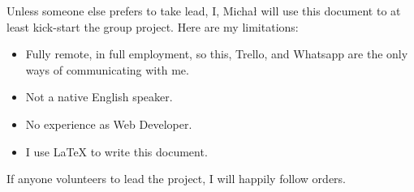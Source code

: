 Unless someone else prefers to take lead, I, Michał will 
use this document to at least kick-start the group project. Here are my limitations:

\begin{itemize}
    \item Fully remote, in full employment, so this, Trello, and Whatsapp are the only ways of
            communicating with me.
    \item Not a native English speaker.
    \item No experience as Web Developer.
    \item I use LaTeX to write this document.
\end{itemize}

\noindent
If anyone volunteers to lead the project, I will happily follow orders. 